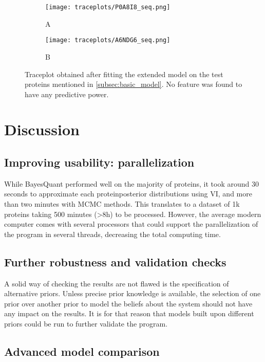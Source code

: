 \begin{figure}[H]
\begin{subfigure}{\textwidth}
\centering
\caption*{A}
\texttt{[image: traceplots/P0A8I8\_seq.png]}
\end{subfigure}
\bigskip
\begin{subfigure}{\textwidth}
\centering
\caption*{B}
\texttt{[image: traceplots/A6NDG6\_seq.png]}
\end{subfigure}
\caption[Traceplot from sequence modelling of peptide effect]{Traceplot obtained after fitting the extended model on the test proteins mentioned in \ref{subsec:basic_model}. No feature was found to have any predictive power.}
\label{fig:traceplots_seq}
\end{figure}

\section{Discussion}

\subsection{Improving usability: parallelization}

While BayesQuant performed well on the majority of proteins, it took around 30 seconds to approximate each protein\textquotesingle posterior distributions using \ac{VI}, and more than two minutes with \ac{MCMC} methods. This translates to a dataset of 1k proteins taking 500 minutes (>8h) to be processed. However, the average modern computer comes with several processors that could support the parallelization of the program in several threads, decreasing the total computing time.

\subsection{Further robustness and validation checks}

A solid way of checking the results are not flawed is the specification of alternative priors. Unless precise prior knowledge is available, the selection of one prior over another prior to model the beliefs about the system should not have any impact on the results. It is for that reason that models built upon different priors could be run to further validate the program.


\subsection{Advanced model comparison}

